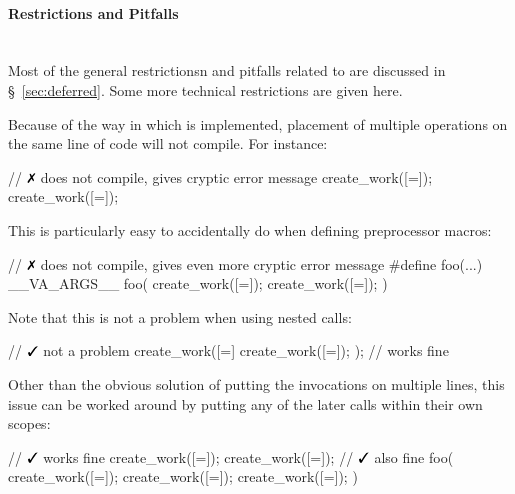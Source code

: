 \paragraph{Restrictions and Pitfalls}\mbox{} \\
Most of the general restrictionsn and pitfalls related to 
are discussed in \S~\ref{sec:deferred}.  Some more technical restrictions are
given here.
\begin{compactitem}
  \item Because of the way in which  is implemented, placement of
    multiple  operations on the same line of code will not compile. 
  For instance:
  \begin{CppCode}
// $\no$ does not compile, gives cryptic error message
create_work([=]{}); create_work([=]{}); 
  \end{CppCode}
  This is particularly easy to accidentally do when defining preprocessor
  macros:
  \begin{CppCode}
// $\no$ does not compile, gives even more cryptic error message
#define foo(...) __VA_ARGS__
foo(
  create_work([=]{}); 
  create_work([=]{}); 
)
  \end{CppCode}
  Note that this is not a problem when using nested  calls:
  \begin{CppCode}
// $\yes$ not a problem
create_work([=]{ create_work([=]{}); }); // works fine
  \end{CppCode}
  Other than the obvious solution of putting the  invocations on
  multiple lines, this issue can be worked around by putting any of the later
   calls within their own scopes:
  \begin{CppCode}
// $\yes$ works fine
create_work([=]{}); { create_work([=]{}); }
// $\yes$ also fine
foo(
  create_work([=]{}); 
  { create_work([=]{}); }
  { create_work([=]{}); }
)
  \end{CppCode}
\end{compactitem}

